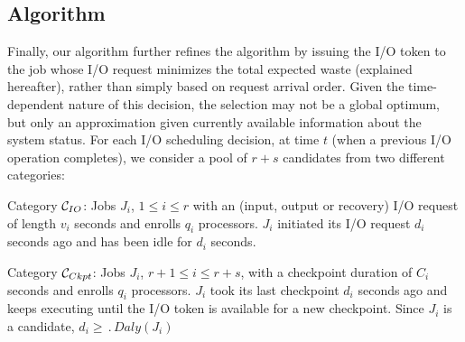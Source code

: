 
\subsection{\leastwaste Algorithm}
\label{sec:least-waste}

Finally, our \leastwaste algorithm further refines the \fifononblock algorithm by
issuing the I/O token to the job whose I/O request minimizes the total expected waste
(explained hereafter), rather than simply based on request arrival order.  Given the
time-dependent nature of this decision, the selection may not be a global optimum,
but only an approximation given currently available information about the system
status.  For each I/O scheduling decision, at time $t$ (when a previous I/O operation
completes), we consider a pool of $r+s$ candidates from two different categories:

\begin{compactitem}
\item Category \IOcat $\mathcal{C}_{IO}$: Jobs $J_{i}$, $1\leq i \leq r$ with an
  (input, output or recovery) I/O request of length $v_{i}$ seconds and enrolls $q_{i}$
  processors. $J_{i}$ initiated its I/O request $d_{i}$ seconds ago and has been idle
  for $d_{i}$ seconds.

\item Category \Ckptcat $\mathcal{C}_{Ckpt}$: Jobs $J_{i}$, $r+1\leq i \leq r+s$,
  with a checkpoint duration of $C_{i}$ seconds and enrolls $q_{i}$ processors.
  $J_{i}$ took its last checkpoint $d_{i}$ seconds ago and keeps executing until the
  I/O token is available for a new checkpoint. Since $J_{i}$ is a candidate,
  $d_{i} \geq \period{Daly}(J_{i})$
\end{compactitem}


